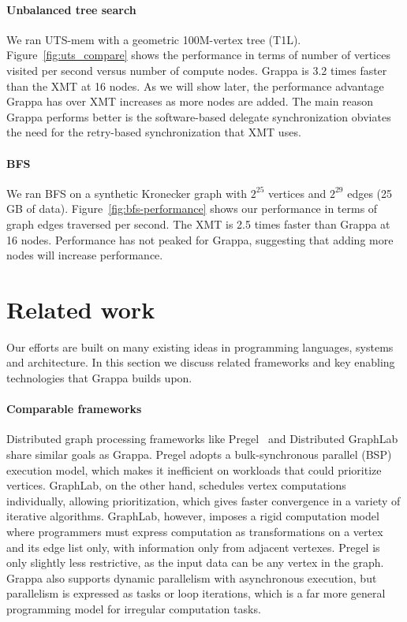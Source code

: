 \paragraph{Unbalanced tree search} We ran UTS-mem with a geometric 100M-vertex
tree (T1L). Figure~\ref{fig:uts_compare} shows the performance in terms of
number of vertices visited per second versus number of compute nodes. Grappa
is 3.2 times faster than the XMT at 16 nodes. As we will show later, the
performance advantage Grappa has over XMT increases as more nodes are added.
The main reason Grappa performs better is the software-based delegate
synchronization obviates the need for the retry-based synchronization that XMT
uses.


\paragraph{BFS} We ran BFS on a synthetic Kronecker graph with $2^{25}$ vertices and $2^{29}$ edges (25 GB of data). Figure~\ref{fig:bfs-performance} shows our performance in terms of graph edges traversed per second. The XMT is 2.5 times faster than Grappa at 16 nodes.  Performance has not peaked for Grappa, suggesting that adding more nodes will increase performance.


\section{Related work}

Our efforts are built on many existing ideas in programming languages, systems and architecture. In this section we discuss related frameworks and key enabling technologies that Grappa builds upon.

\paragraph{Comparable frameworks} Distributed graph processing frameworks like Pregel~\cite{pregel:2010} and Distributed GraphLab~\cite{distgraphlab:vldb12} share similar goals as Grappa. Pregel adopts a bulk-synchronous parallel (BSP) execution model, which makes it inefficient on workloads that could prioritize vertices. GraphLab, on the other hand, schedules vertex computations individually, allowing prioritization, which gives faster convergence in a variety of iterative algorithms.  GraphLab, however, imposes a rigid computation model where programmers must express computation as transformations on a vertex and its edge list only, with information only from adjacent vertexes. Pregel is only slightly less restrictive, as the input data can be any vertex in the graph.  Grappa also supports dynamic parallelism with asynchronous execution, but parallelism is expressed as tasks or loop iterations, which is a far more general programming model for irregular computation tasks.

